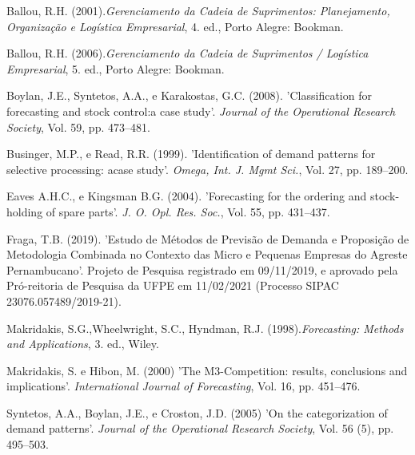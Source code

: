 \documentclass[11pt,letterpaper,twocolumn]{article}
\begin{document}
\begin{thebibliography}{9}

Ballou, R.H. (2001).{\it Gerenciamento da Cadeia de Suprimentos: Planejamento, Organização e Logística Empresarial}, 4. ed., Porto Alegre: Bookman.

Ballou, R.H. (2006).{\it Gerenciamento da Cadeia de Suprimentos / Logística Empresarial}, 5. ed., Porto Alegre: Bookman.

Boylan, J.E., Syntetos, A.A., e Karakostas, G.C. (2008). 'Classification for forecasting and stock control:a case study'. {\it Journal of the Operational Research Society}, Vol. 59, pp. 473--481.

Businger, M.P., e Read, R.R. (1999). 'Identification of demand patterns for selective processing: acase study'. {\it Omega, Int. J. Mgmt Sci.}, Vol. 27, pp. 189--200.

Eaves A.H.C., e Kingsman B.G. (2004). 'Forecasting for the ordering and stock-holding of spare parts'. {\it J. O. Opl. Res. Soc.}, Vol. 55, pp. 431--437.

Fraga, T.B. (2019). 'Estudo de Métodos de Previsão de Demanda e Proposição de Metodologia Combinada no Contexto das Micro e Pequenas
Empresas do Agreste Pernambucano'. Projeto de Pesquisa registrado em 09/11/2019, e aprovado pela Pró-reitoria de Pesquisa da UFPE em 11/02/2021 (Processo SIPAC 23076.057489/2019-21).

Makridakis, S.G.,Wheelwright, S.C., Hyndman, R.J. (1998).{\it Forecasting: Methods and Applications}, 3. ed., Wiley.

Makridakis, S. e Hibon, M. (2000) 'The M3-Competition: results, conclusions and implications'. {\it International Journal of Forecasting}, Vol. 16, pp. 451--476.

Syntetos, A.A., Boylan, J.E., e Croston, J.D. (2005) 'On the categorization of demand patterns'. {\it Journal of the Operational Research Society}, Vol. 56 (5), pp. 495--503.


\end{thebibliography}
\end{document}
